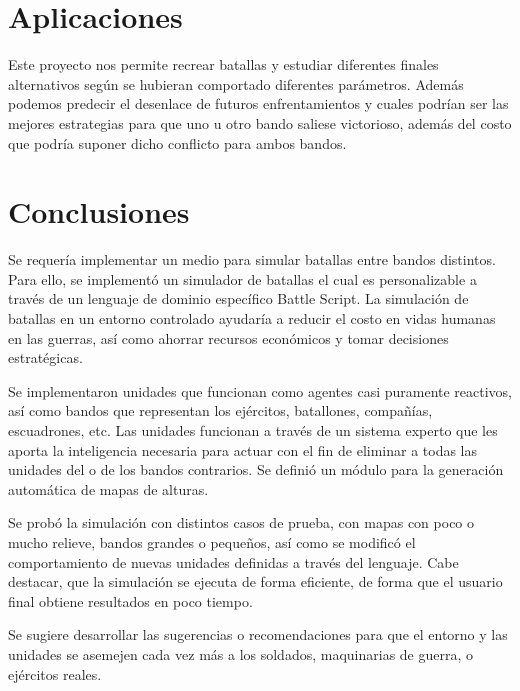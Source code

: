 \section{Aplicaciones}

Este proyecto nos permite recrear batallas y estudiar diferentes finales alternativos según se hubieran comportado diferentes parámetros. Además podemos predecir el desenlace de futuros enfrentamientos y cuales podrían ser las mejores estrategias para que uno u otro bando saliese victorioso, además del costo que podría suponer dicho conflicto para ambos bandos.

\section{Conclusiones}

Se requería implementar un medio para simular batallas entre bandos distintos. Para ello, se implementó un simulador de batallas el cual es personalizable a través de un lenguaje de dominio específico Battle Script. La simulación de batallas en un entorno controlado ayudaría a reducir el costo en vidas humanas en las guerras, así como ahorrar recursos económicos y tomar decisiones estratégicas.

Se implementaron unidades que funcionan como agentes casi puramente reactivos, así como bandos que representan los ejércitos, batallones, compañías, escuadrones, etc. Las unidades funcionan a través de un sistema experto que les aporta la inteligencia necesaria para actuar con el fin de eliminar a todas las unidades del o de los bandos contrarios.  Se definió un módulo para la generación automática de mapas de alturas.

Se probó la simulación con distintos casos de prueba, con mapas con poco o mucho relieve, bandos grandes o pequeños, así como se modificó el comportamiento de nuevas unidades definidas a través del lenguaje. Cabe destacar, que la simulación se ejecuta de forma eficiente, de forma que el usuario final obtiene resultados en poco tiempo.

Se sugiere desarrollar las sugerencias o recomendaciones para que el entorno y las unidades se asemejen cada vez más a los soldados, maquinarias de guerra, o ejércitos reales.